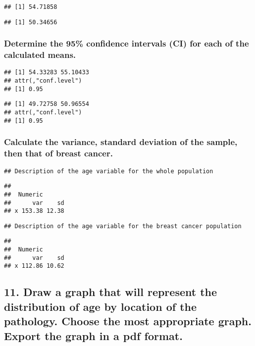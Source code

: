 \documentclass[
]{article}
\begin{document}
\begin{verbatim}
## [1] 54.71858
\end{verbatim}

\begin{verbatim}
## [1] 50.34656
\end{verbatim}

\hypertarget{determine-the-95-confidence-intervals-ci-for-each-of-the-calculated-means.}{%
\subsubsection{Determine the 95\% confidence intervals (CI) for each of
the calculated
means.}\label{determine-the-95-confidence-intervals-ci-for-each-of-the-calculated-means.}}

\begin{verbatim}
## [1] 54.33283 55.10433
## attr(,"conf.level")
## [1] 0.95
\end{verbatim}

\begin{verbatim}
## [1] 49.72758 50.96554
## attr(,"conf.level")
## [1] 0.95
\end{verbatim}

\hypertarget{calculate-the-variance-standard-deviation-of-the-sample-then-that-of-breast-cancer.}{%
\subsubsection{Calculate the variance, standard deviation of the sample,
then that of breast
cancer.}\label{calculate-the-variance-standard-deviation-of-the-sample-then-that-of-breast-cancer.}}

\begin{verbatim}
## Description of the age variable for the whole population
\end{verbatim}

\begin{verbatim}
## 
##  Numeric 
##      var    sd
## x 153.38 12.38
\end{verbatim}

\begin{verbatim}
## Description of the age variable for the breast cancer population
\end{verbatim}

\begin{verbatim}
## 
##  Numeric 
##      var    sd
## x 112.86 10.62
\end{verbatim}

\hypertarget{draw-a-graph-that-will-represent-the-distribution-of-age-by-location-of-the-pathology.-choose-the-most-appropriate-graph.-export-the-graph-in-a-pdf-format.}{%
\subsection{11. Draw a graph that will represent the distribution of age
by location of the pathology. Choose the most appropriate graph. Export
the graph in a pdf
format.}\label{draw-a-graph-that-will-represent-the-distribution-of-age-by-location-of-the-pathology.-choose-the-most-appropriate-graph.-export-the-graph-in-a-pdf-format.}}
\end{document}
